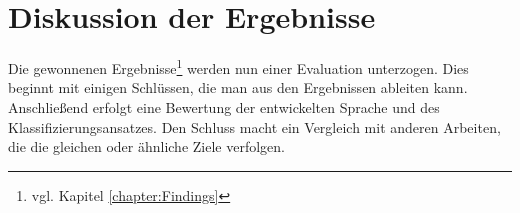\chapter{Diskussion der Ergebnisse}
    \label{chapter:FindingsDiscussion}
    Die gewonnenen Ergebnisse\footnote{vgl. Kapitel \ref{chapter:Findings}}
    werden nun einer Evaluation unterzogen.
    Dies beginnt mit einigen Schlüssen,
    die man aus den Ergebnissen ableiten kann.
    Anschließend erfolgt eine Bewertung der entwickelten Sprache
    und des Klassifizierungsansatzes.
    Den Schluss macht ein Vergleich mit anderen Arbeiten,
    die die gleichen oder ähnliche Ziele verfolgen.

    
    
